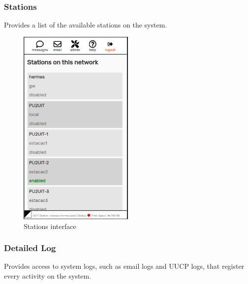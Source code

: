 \documentclass[11pt,a4paper]{article}
\begin{document}
\subsubsection{Stations} 
\label{gui_stations}

Provides a list of the available stations on the system. 

\begin{figure}[H]
    \centering
    \includegraphics[width=0.5\textwidth]{screenshots/frontend/en/stations.png}
    \caption{Stations interface}
	\vspace{-10pt}
    \label{fig:stations}
\end{figure} 
 


    
\subsubsection{Detailed Log}
Provides access to system logs, such as email logs and UUCP logs, that register every activity on the system.
    
\end{document}

